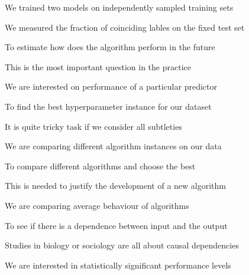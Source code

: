 \documentclass[landscape,footrule]{foils}
\begin{document}

\enlargethispage{1cm}
\vspace{2ex}
\begin{triangles}
\item We trained two models on independently sampled training sets
\item We measured the fraction of coinciding lables on the fixed test set
\end{triangles}




\begin{triangles}
\item To estimate how does the algorithm perform in the future
\begin{diamonds}
\item This is the most important question in the practice 
\item We are interested on performance of a particular predictor\vspace*{2ex} 
\end{diamonds}

\item To find the best hyperparameter instance for our dataset   
\begin{diamonds}
\item It is quite tricky task if we consider all subtleties 
\item We are comparing different algorithm instances on our data\vspace*{2ex}
\end{diamonds}


\item To compare different algorithms and choose the best 
\begin{diamonds}
\item This is needed to justify the development of a new algorithm 
\item We are comparing average behaviour of algorithms\vspace*{2ex} 
\end{diamonds}

\item To see if there is a dependence between input and the output
\begin{diamonds}
\item Studies in biology or sociology are all about causal dependencies
\item We are interested in statistically significant performance levels 
\end{diamonds}

\end{triangles}
\end{document}
